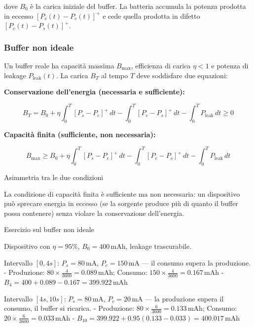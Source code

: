 \documentclass[
  italian,
  openany]{book}
\begin{document}
dove \(B_0\) è la carica iniziale del buffer. La batteria accumula la
potenza prodotta in eccesso \([P_s(t) - P_c(t)]^+\) e cede quella
prodotta in difetto \([P_c(t) - P_s(t)]^+\).

\subsubsection{Buffer non ideale}\label{buffer-non-ideale}

Un buffer reale ha capacità massima \(B_{\mathrm{max}}\), efficienza di
carica \(\eta < 1\) e potenza di leakage \(P_{\mathrm{leak}}(t)\). La
carica \(B_T\) al tempo \(T\) deve soddisfare due equazioni:

\textbf{Conservazione dell'energia (necessaria e sufficiente):}

\[B_T = B_0 + \eta\int_0^T [P_s - P_c]^+\,dt - \int_0^T [P_c - P_s]^+\,dt - \int_0^T P_{\mathrm{leak}}\,dt \geq 0\]

\textbf{Capacità finita (sufficiente, non necessaria):}

\[B_{\mathrm{max}} \geq B_0 + \eta\int_0^T [P_s - P_c]^+\,dt - \int_0^T [P_c - P_s]^+\,dt - \int_0^T P_{\mathrm{leak}}\,dt\]

\begin{calloutnote}{Asimmetria tra le due condizioni}

La condizione di capacità finita è sufficiente ma non necessaria: un
dispositivo può sprecare energia in eccesso (se la sorgente produce più
di quanto il buffer possa contenere) senza violare la conservazione
dell'energia.

\end{calloutnote}

\begin{callouttip}{Esercizio sul buffer non ideale}

Dispositivo con \(\eta = 95\%\), \(B_0 = 400\,\mathrm{mAh}\), leakage
trascurabile.

Intervallo \([0, 4s]\): \(P_s = 80\,\mathrm{mA}\),
\(P_c = 150\,\mathrm{mA}\) --- il consumo supera la produzione. -
Produzione: \(80 \times \frac{4}{3600} = 0.089\,\mathrm{mAh}\); Consumo:
\(150 \times \frac{4}{3600} = 0.167\,\mathrm{mAh}\) -
\(B_4 = 400 + 0.089 - 0.167 = 399.922\,\mathrm{mAh}\)

Intervallo \([4s, 10s]\): \(P_s = 80\,\mathrm{mA}\),
\(P_c = 20\,\mathrm{mA}\) --- la produzione supera il consumo, il buffer
si ricarica. - Produzione:
\(80 \times \frac{6}{3600} = 0.133\,\mathrm{mAh}\); Consumo:
\(20 \times \frac{6}{3600} = 0.033\,\mathrm{mAh}\) -
\(B_{10} = 399.922 + 0.95(0.133 - 0.033) = 400.017\,\mathrm{mAh}\)

\end{callouttip}
\end{document}
